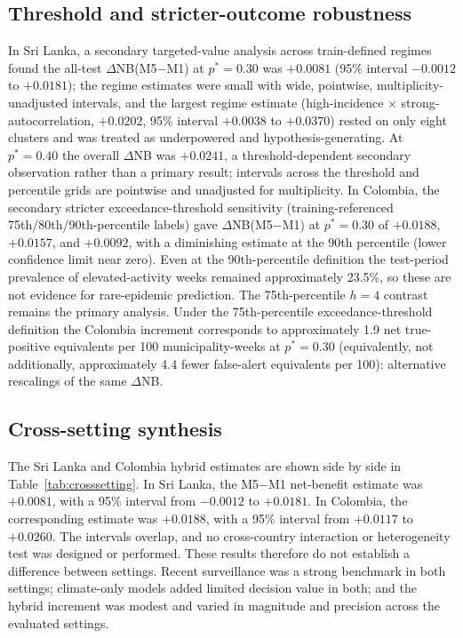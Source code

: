 \documentclass[11pt,a4paper]{article}
\begin{document}
\subsection{Threshold and stricter-outcome robustness}
In Sri Lanka, a secondary targeted-value analysis across train-defined regimes found the all-test $\Delta$NB(M5$-$M1) at $p^*=0.30$ was $+0.0081$ (95\% interval $-0.0012$ to $+0.0181$); the regime estimates were small with wide, pointwise, multiplicity-unadjusted intervals, and the largest regime estimate (high-incidence $\times$ strong-autocorrelation, $+0.0202$, 95\% interval $+0.0038$ to $+0.0370$) rested on only eight clusters and was treated as underpowered and hypothesis-generating. At $p^*=0.40$ the overall $\Delta$NB was $+0.0241$, a threshold-dependent secondary observation rather than a primary result; intervals across the threshold and percentile grids are pointwise and unadjusted for multiplicity. In Colombia, the secondary stricter exceedance-threshold sensitivity (training-referenced 75th/80th/90th-percentile labels) gave $\Delta$NB(M5$-$M1) at $p^*=0.30$ of $+0.0188$, $+0.0157$, and $+0.0092$, with a diminishing estimate at the 90th percentile (lower confidence limit near zero). Even at the 90th-percentile definition the test-period prevalence of elevated-activity weeks remained approximately 23.5\%, so these are not evidence for rare-epidemic prediction. The 75th-percentile $h=4$ contrast remains the primary analysis. Under the 75th-percentile exceedance-threshold definition the Colombia increment corresponds to approximately 1.9 net true-positive equivalents per 100 municipality-weeks at $p^*=0.30$ (equivalently, not additionally, approximately 4.4 fewer false-alert equivalents per 100): alternative rescalings of the same $\Delta$NB.

\subsection{Cross-setting synthesis}
The Sri Lanka and Colombia hybrid estimates are shown side by side in Table~\ref{tab:crosssetting}. In Sri Lanka, the M5$-$M1 net-benefit estimate was $+0.0081$, with a 95\% interval from $-0.0012$ to $+0.0181$. In Colombia, the corresponding estimate was $+0.0188$, with a 95\% interval from $+0.0117$ to $+0.0260$. The intervals overlap, and no cross-country interaction or heterogeneity test was designed or performed. These results therefore do not establish a difference between settings. Recent surveillance was a strong benchmark in both settings; climate-only models added limited decision value in both; and the hybrid increment was modest and varied in magnitude and precision across the evaluated settings.
\end{document}
